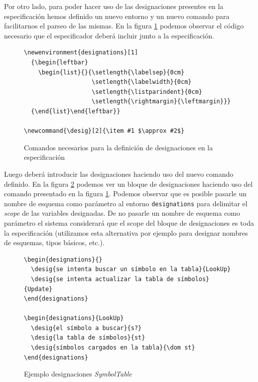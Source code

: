 Por otro lado, para poder hacer uso de las designaciones presentes en la especificación hemos definido un nuevo entorno y un nuevo comando para facilitarnos el parseo de las mismas. En la figura \ref{img:comandos_designaciones} podemos observar el código necesario que el especificador deberá incluir junto a la especificación.

\begin{figure}[H]
\centering
\begin{Verbatim}[frame=single,fontsize=\scriptsize]
\newenvironment{designations}[1]
  {\begin{leftbar}
    \begin{list}{}{\setlength{\labelsep}{0cm}
                   \setlength{\labelwidth}{0cm}
                   \setlength{\listparindent}{0cm}
                   \setlength{\rightmargin}{\leftmargin}}}
  {\end{list}\end{leftbar}}

\newcommand{\desig}[2]{\item #1 $\approx #2$}
\end{Verbatim}
\caption{Comandos necesarios para la definición de designaciones en la especificación}
\label{img:comandos_designaciones}
\end{figure}

Luego deberá introducir las designaciones haciendo uso del nuevo comando definido. En la figura \ref{ej:comandos_designaciones} podemos ver un bloque de designaciones haciendo uso del comando presentado en la figura \ref{img:comandos_designaciones}. Podemos observar que es posible pasarle un nombre de esquema como parámetro al entorno \texttt{designations} para delimitar el \textit{scope} de las variables designadas. De no pasarle un nombre de esquema como parámetro el sistema considerará que el scope del bloque de designaciones es toda la especificación (utilizamos esta alternativa por ejemplo para designar nombres de esquemas, tipos básicos, etc.).

\begin{figure}[H]
\centering
\begin{Verbatim}[frame=single,fontsize=\scriptsize]
\begin{designations}{}
  \desig{se intenta buscar un símbolo en la tabla}{LookUp}
  \desig{se intenta actualizar la tabla de símbolos}{Update}
\end{designations}

\begin{designations}{LookUp}
  \desig{el símbolo a buscar}{s?}
  \desig{la tabla de símbolos}{st}
  \desig{símbolos cargados en la tabla}{\dom st}
\end{designations}
\end{Verbatim}
\caption{Ejemplo designaciones \textit{SymbolTable}}
\label{ej:comandos_designaciones}
\end{figure}

